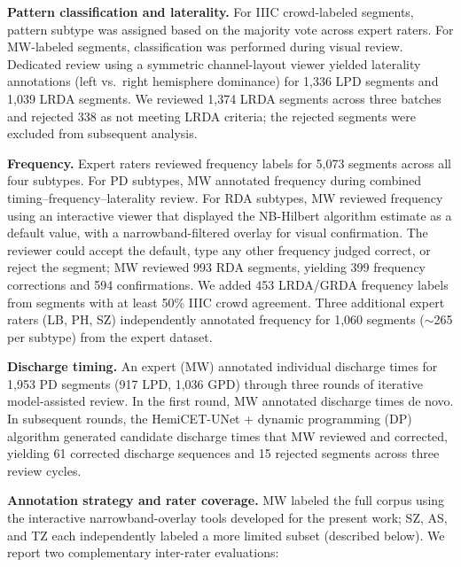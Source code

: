 \documentclass{iopjournal}
\begin{document}
\textbf{Pattern classification and laterality.} For IIIC crowd-labeled segments, pattern subtype was assigned based on the majority vote across expert raters. For MW-labeled segments, classification was performed during visual review. Dedicated review using a symmetric channel-layout viewer yielded laterality annotations (left vs.\ right hemisphere dominance) for 1,336 LPD segments and 1,039 LRDA segments. We reviewed 1,374 LRDA segments across three batches and rejected 338 as not meeting LRDA criteria; the rejected segments were excluded from subsequent analysis.

\textbf{Frequency.} Expert raters reviewed frequency labels for 5,073 segments across all four subtypes. For PD subtypes, MW annotated frequency during combined timing--frequency--laterality review. For RDA subtypes, MW reviewed frequency using an interactive viewer that displayed the NB-Hilbert algorithm estimate as a default value, with a narrowband-filtered overlay for visual confirmation. The reviewer could accept the default, type any other frequency judged correct, or reject the segment; MW reviewed 993 RDA segments, yielding 399 frequency corrections and 594 confirmations. We added 453 LRDA/GRDA frequency labels from segments with at least 50\% IIIC crowd agreement. Three additional expert raters (LB, PH, SZ) independently annotated frequency for 1,060 segments ($\sim$265 per subtype) from the expert dataset.

\textbf{Discharge timing.} An expert (MW) annotated individual discharge times for 1,953 PD segments (917 LPD, 1,036 GPD) through three rounds of iterative model-assisted review. In the first round, MW annotated discharge times de novo. In subsequent rounds, the HemiCET-UNet + dynamic programming (DP) algorithm generated candidate discharge times that MW reviewed and corrected, yielding 61 corrected discharge sequences and 15 rejected segments across three review cycles.

\textbf{Annotation strategy and rater coverage.} MW labeled the full corpus using the interactive narrowband-overlay tools developed for the present work; SZ, AS, and TZ each independently labeled a more limited subset (described below). We report two complementary inter-rater evaluations:
\end{document}
